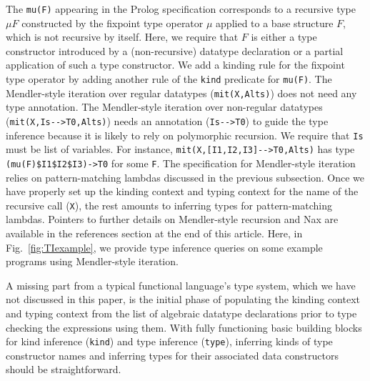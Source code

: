 \documentclass[runningheads,a4paper]{llncs}
\begin{document}
The \verb|mu(F)| appearing in the Prolog specification corresponds to
a recursive type $\mu F$ constructed by the fixpoint type operator $\mu$
applied to a base structure $F$, which is not recursive by itself.
Here, we require that $F$ is either a type constructor introduced by
a (non-recursive) datatype declaration or a partial application of
such a type constructor. We add a kinding rule for the fixpoint type operator
by adding another rule of the \verb|kind| predicate for \verb|mu(F)|.
The Mendler-style iteration over regular datatypes (\verb|mit(X,Alts)|)
does not need any type annotation. The Mendler-style iteration over
non-regular datatypes (\verb|mit(X,Is-->T0,Alts)|) needs an annotation
(\verb|Is-->T0|) to guide the type inference because it is likely to rely on
polymorphic recursion. We require that \texttt{Is} must be list of variables.
For instance, \verb|mit(X,[I1,I2,I3]-->T0,Alts)| has type
\verb|(mu(F)$I1$I2$I3)->T0| for some \verb|F|. The specification for
Mendler-style iteration relies on pattern-matching lambdas discussed in
the previous subsection. Once we have properly set up the kinding context
and typing context for the name of the recursive call (\verb|X|), the rest
amounts to inferring types for pattern-matching lambdas. Pointers to further
details on Mendler-style recursion \cite{vene00phd,AbeMatUus03,AhnShe11} and
Nax \cite{Ahn14thesis} are available in the references section at the end of
this article. Here, in Fig.~\ref{fig:TIexample}, we provide type inference
queries on some example programs using Mendler-style iteration.




A missing part from a typical functional language's type system, which
we have not discussed in this paper, is the initial phase of populating
the kinding context and typing context from the list of algebraic datatype
declarations prior to type checking the expressions using them.
With fully functioning basic building blocks for kind inference
(\verb|kind|) and type inference (\verb|type|), inferring kinds of
type constructor names and inferring types for their associated
data constructors should be straightforward.
\end{document}
